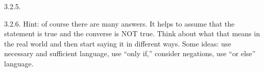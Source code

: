 \begin {itemize}
\begin{ans}{3.2.5.}
  
\end{ans}
\begin{ans}{3.2.6.}
    Hint: of course there are many answers.  It helps to assume that the statement is true and the converse is NOT true.  Think about what that means in the real world and then start saying it in different ways.  Some ideas: use necessary and sufficient language, use ``only if,'' consider negations, use ``or else'' language.
  
\end{ans}
\protect \end {itemize}
